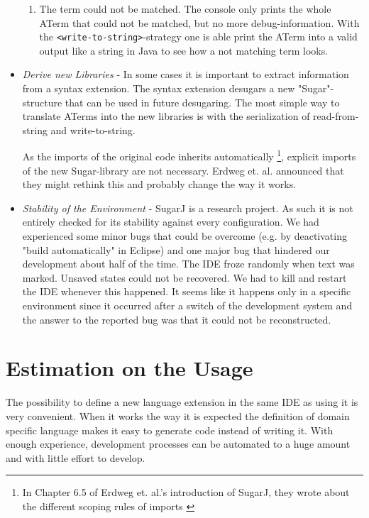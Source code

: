 \documentclass{report}
\begin{document}
\begin{itemize}
\begin{enumerate}
 \item The term could not be matched. The console only prints the whole ATerm that could not be matched, but no more debug-information. With the \lstinline{<write-to-string>}-strategy one is able print the ATerm into a valid output like a string in Java to see how a not matching term looks.
\end{enumerate}
\item \emph{Derive new Libraries} - In some cases it is important to extract information from a syntax extension. The syntax extension desugars a new "Sugar"-structure that can be used in future desugaring. The most simple way to translate ATerms into the new libraries is with the serialization of read-from-string and write-to-string.

As the imports of the original code inherits automatically \footnote{In Chapter 6.5 of Erdweg et. al.'s introduction of SugarJ, they wrote about the different scoping rules of imports \cite{Erdweg-SugarJ-2011}}, explicit imports of the new Sugar-library are not necessary. Erdweg et. al. announced that they might rethink this and probably change the way it works.
\item \emph{Stability of the Environment} - SugarJ is a research project. As such it is not entirely checked for its stability against every configuration. We had experienced some minor bugs that could be overcome (e.g. by deactivating "build automatically" in Eclipse) and one major bug that hindered our development about half of the time. The IDE froze randomly when text was marked. Unsaved states could not be recovered. We had to kill and restart the IDE whenever this happened. It seems like it happens only in a specific environment since it occurred after a switch of the development system and the answer to the reported bug was that it could not be reconstructed.
\end{itemize}

\section{Estimation on the Usage}

The possibility to define a new language extension in the same IDE as using it is very convenient. When it works the way it is expected the definition of domain specific language makes it easy to generate code instead of writing it. With enough experience, development processes can be automated to a huge amount and with little effort to develop.
\end{document}
